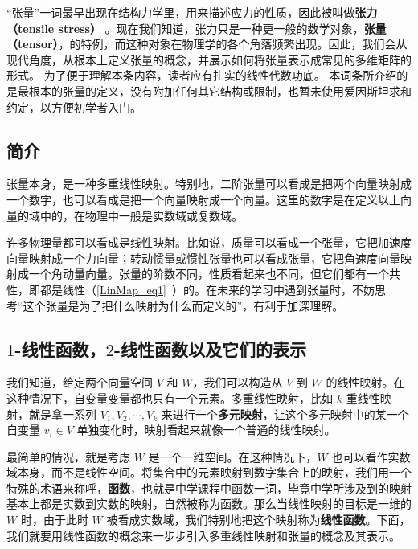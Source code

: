 


“张量”一词最早出现在结构力学里，用来描述应力的性质，因此被叫做\textbf{张力（tensile stress）}%
。现在我们知道，张力只是一种更一般的数学对象，\textbf{张量（tensor）}，的特例，而这种对象在物理学的各个角落频繁出现。因此，我们会从现代角度，从根本上定义张量的概念，并展示如何将张量表示成常见的多维矩阵的形式。 为了便于理解本条内容，读者应有扎实的线性代数功底。 本词条所介绍的是最根本的张量的定义，没有附加任何其它结构或限制，也暂未使用爱因斯坦求和约定，以方便初学者入门。

\subsection{简介}

张量本身，是一种多重线性映射。特别地，二阶张量可以看成是把两个向量映射成一个数字，也可以看成是把一个向量映射成一个向量。这里的数字是在定义以上向量的域中的，在物理中一般是实数域或复数域。

许多物理量都可以看成是线性映射。比如说，质量可以看成一个张量，它把加速度向量映射成一个力向量；转动惯量或惯性张量也可以看成张量，它把角速度向量映射成一个角动量向量。张量的阶数不同，性质看起来也不同，但它们都有一个共性，即都是线性（\autoref{LinMap_eq1}~）的。在未来的学习中遇到张量时，不妨思考“这个张量是为了把什么映射为什么而定义的”，有利于加深理解。

\subsection{$1$-线性函数，$2$-线性函数以及它们的表示}\label{Tensor_sub1}

我们知道，给定两个向量空间 $V$ 和 $W$，我们可以构造从 $V$ 到 $W$ 的线性映射。在这种情况下，自变量变量都也只有一个元素。多重线性映射，比如 $k$ 重线性映射，就是拿一系列 $V_1, V_2, \cdots, V_k$ 来进行一个\textbf{多元映射}，让这个多元映射中的某一个自变量 ${v}_i\in V$ 单独变化时，映射看起来就像一个普通的线性映射。

最简单的情况，就是考虑 $W$ 是一个一维空间。在这种情况下，$W$ 也可以看作实数域本身，而不是线性空间。将集合中的元素映射到数字集合上的映射，我们用一个特殊的术语来称呼，\textbf{函数}，也就是中学课程中函数一词，毕竟中学所涉及到的映射基本上都是实数到实数的映射，自然被称为函数。那么当线性映射的目标是一维的 $W$ 时，由于此时 $W$ 被看成实数域，我们特别地把这个映射称为\textbf{线性函数}。下面，我们就要用线性函数的概念来一步步引入多重线性映射和张量的概念及其表示。

